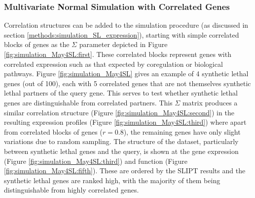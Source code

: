\subsubsection{Multivariate Normal Simulation with Correlated Genes} \label{results:simulation_mvtnorm_cor}

Correlation structures can be added to the simulation procedure (as discussed in section \ref{methods:simulation_SL_expression}), starting with simple correlated blocks of genes as the $\Sigma$ parameter depicted in Figure \ref{fig:simulation_May4SL:first}. These correlated blocks represent genes with correlated expression such as that expected by coregulation or biological pathways. Figure \ref{fig:simulation_May4SL} gives an example of 4 synthetic lethal genes (out of 100), each with 5 correlated genes that are not themselves synthetic lethal partners of the query gene. This serves to test whether synthetic lethal genes are distinguishable from correlated partners. This $\Sigma$ matrix produces a similar correlation structure (Figure \ref{fig:simulation_May4SL:second}) in the resulting expression profiles (Figure \ref{fig:simulation_May4SL:third}) where apart from correlated blocks of genes ($r = 0.8$), the remaining genes have only slight variations due to random sampling. The structure of the dataset, particularly between synthetic lethal genes and the query, is shown at the gene expression (Figure \ref{fig:simulation_May4SL:third}) and function (Figure \ref{fig:simulation_May4SL:fifth}). These are ordered by the SLIPT results and the synthetic lethal genes are ranked high, with the majority of them being distinguishable from highly correlated genes.

